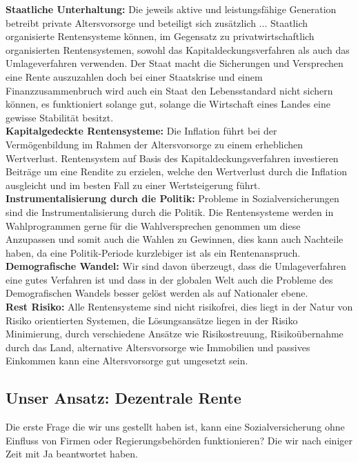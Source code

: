 \textbf{Staatliche Unterhaltung:} Die jeweils aktive und leistungsfähige Generation betreibt private Altersvorsorge und beteiligt sich zusätzlich ...
Staatlich organisierte Rentensysteme können, im Gegensatz zu privatwirtschaftlich organisierten Rentensystemen, sowohl das Kapitaldeckungsverfahren als auch das Umlageverfahren verwenden. 
Der Staat macht die Sicherungen und Versprechen eine Rente auszuzahlen doch bei einer Staatskrise und einem Finanzzusammenbruch wird auch ein Staat den Lebensstandard nicht sichern können, es funktioniert solange gut, solange die Wirtschaft eines Landes eine gewisse Stabilität besitzt.\\
\textbf{Kapitalgedeckte Rentensysteme:} Die Inflation führt bei der Vermögenbildung im Rahmen der Altersvorsorge zu einem erheblichen Wertverlust. 
Rentensystem auf Basis des Kapitaldeckungsverfahren investieren Beiträge um eine Rendite zu erzielen, welche den Wertverlust durch die Inflation ausgleicht und im besten Fall zu einer Wertsteigerung führt. \\
\textbf{Instrumentalisierung durch die Politik:} Probleme in Sozialversicherungen sind die Instrumentalisierung durch die Politik.
Die Rentensysteme werden in Wahlprogrammen gerne für die Wahlversprechen genommen um diese Anzupassen und somit auch die Wahlen zu Gewinnen, dies kann auch Nachteile haben, da eine Politik-Periode kurzlebiger ist als ein Rentenanspruch. \\
\textbf{Demografische Wandel:} Wir sind davon überzeugt, dass die Umlageverfahren eine gutes Verfahren ist und dass in der globalen Welt auch die Probleme des Demografischen Wandels besser gelöst werden als auf Nationaler ebene. \\
\textbf{Rest Risiko:} Alle Rentensysteme sind nicht risikofrei, dies liegt in der Natur von Risiko orientierten Systemen, die Lösungsansätze liegen in der Risiko Minimierung, durch verschiedene Ansätze wie Risikostreuung, Risikoübernahme durch das Land, alternative Altersvorsorge wie Immobilien und passives Einkommen kann eine Altersvorsorge gut umgesetzt sein.


\subsection{Unser Ansatz: Dezentrale Rente}

Die erste Frage die wir uns gestellt haben ist, kann eine Sozialversicherung ohne Einfluss von Firmen oder Regierungsbehörden funktionieren? Die wir nach einiger Zeit mit Ja beantwortet haben.

